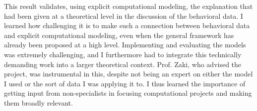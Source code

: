 \documentclass[12pt]{article}
\begin{document}
This result validates, using explicit computational modeling, the explanation that had been given at a theoretical level in the discussion of the behavioral data.  I learned how challenging it is to make such a connection between behavioral data and explicit computational modeling, even when the general framework has already been proposed at a high level.  Implementing and evaluating the models was extremely challenging, and I furthermore had to integrate this technically demanding work into a larger theoretical context.  Prof. Zaki, who advised the project, was instrumental in this, despite not being an expert on either the model I used or the sort of data I was applying it to.  I thus learned the importance of getting input from non-specialists in focusing computational projects and making them broadly relevant.



\end{document}

